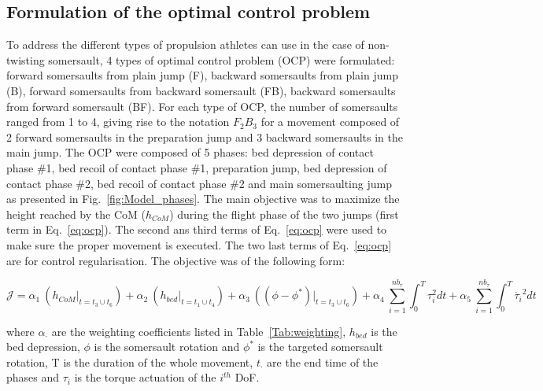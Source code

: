 \subsection{Formulation of the optimal control problem}\label{subsec:2e}
To address the different types of propulsion athletes can use in the case of non-twisting somersault, 4 types of optimal control problem (OCP) were formulated: forward somersaults from plain jump (F), backward somersaults from plain jump (B), forward somersaults from backward somersault (FB), backward somersaults from forward somersault (BF).
For each type of OCP, the number of somersaults ranged from 1 to 4, giving rise to the notation $F_2B_3$ for a movement composed of 2 forward somersaults in the preparation jump and 3 backward somersaults in the main jump.
The OCP were composed of 5 phases: bed depression of contact phase \#1, bed recoil of contact phase \#1, preparation jump, bed depression of contact phase \#2, bed recoil of contact phase \#2 and main somersaulting jump as presented in Fig.~\ref{fig:Model_phases}.
The main objective was to maximize the height reached by the CoM ($h_{CoM}$) during the flight phase of the two jumps (first term in Eq.~\ref{eq:ocp}).
The second ans third terms of Eq.~\ref{eq:ocp} were used to make sure the proper movement is executed.
The two last terms of Eq.~\ref{eq:ocp} are for control regularisation.
The objective was of the following form:

\[
\mathcal{J} = \alpha_1~(h_{CoM} \big\rvert_{t = t_3 \cup t_6}) + \alpha_2~(h_{bed} \big\rvert_{t = t_1 \cup t_4}) + \alpha_3~((\phi - \phi^*) \big\rvert_{t = t_3 \cup t_6}) + \alpha_4~\sum_{i=1}^{nb_{\tau}} \int_0^T \tau_{i}^2 dt + \alpha_5~\sum_{i=1}^{nb_{\tau}}  \int_0^T \dot{\tau_{i}}^2 dt \label{eq:ocp}
\]

\noindent where $\alpha_\cdot$ are the weighting coefficients listed in Table~\ref{Tab:weighting}, $h_{bed}$ is the bed depression, $\phi$ is the somersault rotation and $\phi^*$ is the targeted somersault rotation, T is the duration of the whole movement, $t_{\cdot}$ are the end time of the phases and $\tau_i$ is the torque actuation of the $i^{th}$ DoF.



